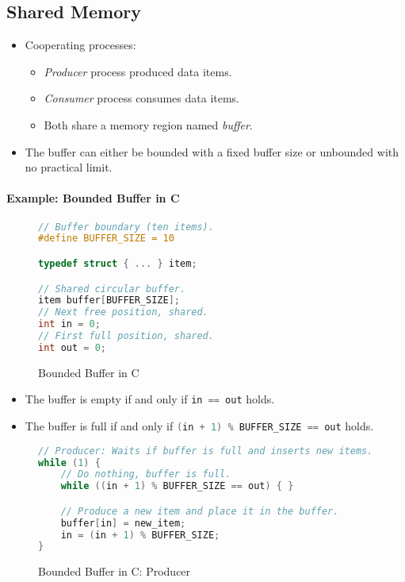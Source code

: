         \subsection{Shared Memory}
            \begin{itemize}
            	\item Cooperating processes:
                	\begin{itemize}
                		\item \textit{Producer} process produced data items.
                		\item \textit{Consumer} process consumes data items.
                		\item Both share a memory region named \textit{buffer}.
                	\end{itemize}
            	\item The buffer can either be bounded with a fixed buffer size or unbounded with no practical limit.
            \end{itemize}
        
            \paragraph{Example: Bounded Buffer in C}
	            \begin{figure}[H]
	            	\centering
	            	\begin{lstlisting}[language = C]
// Buffer boundary (ten items).
#define BUFFER_SIZE = 10

typedef struct { ... } item;

// Shared circular buffer.
item buffer[BUFFER_SIZE];
// Next free position, shared.
int in = 0;
// First full position, shared.
int out = 0;
\end{lstlisting}
	            	\caption{Bounded Buffer in C}
	            \end{figure}
	            \begin{itemize}
	            	\item The buffer is empty if and only if \lstinline[language = C]|in == out| holds.
	            	\item The buffer is full if and only if \lstinline[language = C]|(in + 1) % BUFFER_SIZE == out| holds.
	            \end{itemize}
            
	            \begin{figure}[H]
	            	\centering
	            	\begin{lstlisting}[language = C]
// Producer: Waits if buffer is full and inserts new items.
while (1) {
	// Do nothing, buffer is full.
	while ((in + 1) % BUFFER_SIZE == out) { }

	// Produce a new item and place it in the buffer.
	buffer[in] = new_item;
	in = (in + 1) % BUFFER_SIZE;
}
\end{lstlisting}
	            	\caption{Bounded Buffer in C: Producer}
	            \end{figure}
            
